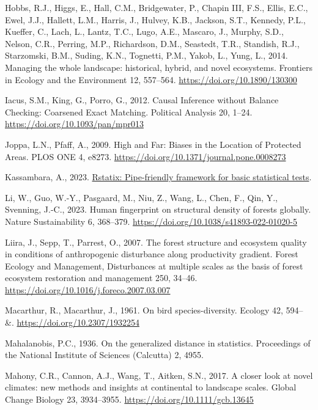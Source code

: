 \documentclass[
]{agujournal2019}
\newlength{\cslhangindent}
\newenvironment{CSLReferences}[2] %
 {\begin{list}{}{%
  \setlength{\itemindent}{0pt}
  \setlength{\leftmargin}{0pt}
  \setlength{\parsep}{0pt}
  \ifodd #1
   \setlength{\leftmargin}{\cslhangindent}
   \setlength{\itemindent}{-1\cslhangindent}
  \fi
  \setlength{\itemsep}{#2\baselineskip}}}
 {\end{list}}
\begin{document}
\begin{CSLReferences}{1}{0}
Hobbs, R.J., Higgs, E., Hall, C.M., Bridgewater, P., Chapin III, F.S.,
Ellis, E.C., Ewel, J.J., Hallett, L.M., Harris, J., Hulvey, K.B.,
Jackson, S.T., Kennedy, P.L., Kueffer, C., Lach, L., Lantz, T.C., Lugo,
A.E., Mascaro, J., Murphy, S.D., Nelson, C.R., Perring, M.P.,
Richardson, D.M., Seastedt, T.R., Standish, R.J., Starzomski, B.M.,
Suding, K.N., Tognetti, P.M., Yakob, L., Yung, L., 2014. Managing the
whole landscape: historical, hybrid, and novel ecosystems. Frontiers in
Ecology and the Environment 12, 557--564.
\url{https://doi.org/10.1890/130300}

Iacus, S.M., King, G., Porro, G., 2012. Causal Inference without Balance
Checking: Coarsened Exact Matching. Political Analysis 20, 1--24.
\url{https://doi.org/10.1093/pan/mpr013}

Joppa, L.N., Pfaff, A., 2009. High and Far: Biases in the Location of
Protected Areas. PLOS ONE 4, e8273.
\url{https://doi.org/10.1371/journal.pone.0008273}

Kassambara, A., 2023.
\href{https://rpkgs.datanovia.com/rstatix/}{Rstatix: Pipe-friendly
framework for basic statistical tests}.

Li, W., Guo, W.-Y., Pasgaard, M., Niu, Z., Wang, L., Chen, F., Qin, Y.,
Svenning, J.-C., 2023. Human fingerprint on structural density of
forests globally. Nature Sustainability 6, 368--379.
\url{https://doi.org/10.1038/s41893-022-01020-5}

Liira, J., Sepp, T., Parrest, O., 2007. The forest structure and
ecosystem quality in conditions of anthropogenic disturbance along
productivity gradient. Forest Ecology and Management, Disturbances at
multiple scales as the basis of forest ecosystem restoration and
management 250, 34--46.
\url{https://doi.org/10.1016/j.foreco.2007.03.007}

Macarthur, R., Macarthur, J., 1961. On bird species-diversity. Ecology
42, 594-- \&. \url{https://doi.org/10.2307/1932254}

Mahalanobis, P.C., 1936. On the generalized distance in statistics.
Proceedings of the National Institute of Sciences (Calcutta) 2, 4955.

Mahony, C.R., Cannon, A.J., Wang, T., Aitken, S.N., 2017. A closer look
at novel climates: new methods and insights at continental to landscape
scales. Global Change Biology 23, 3934--3955.
\url{https://doi.org/10.1111/gcb.13645}


\end{CSLReferences}
\end{document}
